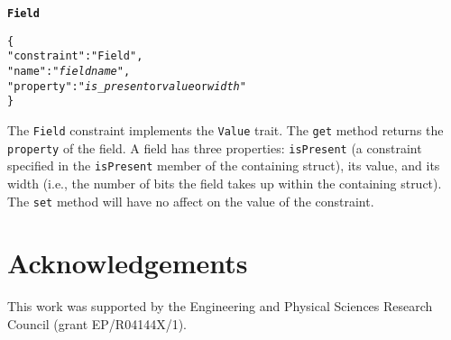 \documentclass[10pt,twocolumn,a4paper]{article}
\newcommand{\code}[1]{\texttt{#1}}
\begin{document}
\textbf{\texttt{Field}}

\footnotesize
\begin{alltt}
  \{
    "constraint"   : "Field",
    "name"         : "\emph{field name}",
    "property"     : "\emph{is\_present} or \emph{value} or \emph{width}"
  \}
\end{alltt}
\normalsize

The \code{Field} constraint implements the \code{Value} trait. The \code{get} method
returns the \code{property} of the field. A field has three properties: \code{isPresent}
(a constraint specified in the \code{isPresent} member of the containing struct), its
value, and its width (i.e., the number of bits the field takes up within the containing
struct). The \code{set} method will have no affect on the value of the constraint.

\section{Acknowledgements}

This work was supported by the Engineering and Physical Sciences Research
Council (grant EP/R04144X/1).



\ifpdf
  \ifdefined\pdftrailerid
    \pdftrailerid{}
  \fi
\fi
\end{document}
